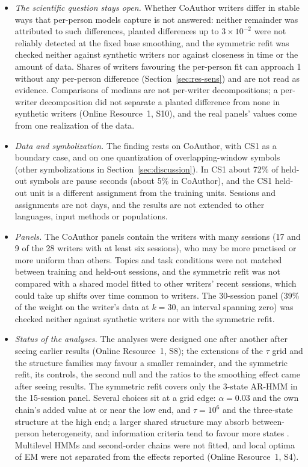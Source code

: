 \documentclass[pdflatex,sn-basic]{sn-jnl}
\newcommand{\Sref}[1]{Online Resource~1, S#1}
\newcommand{\arthree}{\mbox{3-state} \mbox{AR-HMM}}
\begin{document}
\begin{itemize}
\item \emph{The scientific question stays open.} Whether CoAuthor writers differ in stable ways that per-person models capture is not answered: neither remainder was attributed to such differences, planted differences up to $3\times10^{-2}$ were not reliably detected at the fixed base smoothing, and the symmetric refit was checked neither against synthetic writers nor against closeness in time or the amount of data. Shares of writers favouring the per-person fit can approach 1 without any per-person difference (Section~\ref{sec:res-sens}) and are not read as evidence. Comparisons of medians are not per-writer decompositions; a per-writer decomposition did not separate a planted difference from none in synthetic writers (\Sref{10}), and the real panels' values come from one realization of the data.
\item \emph{Data and symbolization.} The finding rests on CoAuthor, with CS1 as a boundary case, and on one quantization of overlapping-window symbols (other symbolizations in Section~\ref{sec:discussion}). In CS1 about 72\% of held-out symbols are pause seconds (about 5\% in CoAuthor), and the CS1 held-out unit is a different assignment from the training units. Sessions and assignments are not days, and the results are not extended to other languages, input methods or populations.
\item \emph{Panels.} The CoAuthor panels contain the writers with many sessions (17 and 9 of the 28 writers with at least six sessions), who may be more practised or more uniform than others. Topics and task conditions were not matched between training and held-out sessions, and the symmetric refit was not compared with a shared model fitted to other writers' recent sessions, which could take up shifts over time common to writers. The 30-session panel (39\% of the weight on the writer's data at $k=30$, an interval spanning zero) was checked neither against synthetic writers nor with the symmetric refit.
\item \emph{Status of the analyses.} The analyses were designed one after another after seeing earlier results (\Sref{8}); the extensions of the $\tau$ grid and the structure families may favour a smaller remainder, and the symmetric refit, its controls, the second null and the ratios to the smoothing effect came after seeing results. The symmetric refit covers only the \arthree{} in the 15-session panel. Several choices sit at a grid edge: $\alpha=0.03$ and the own chain's added value at or near the low end, and $\tau=10^6$ and the three-state structure at the high end; a larger shared structure may absorb between-person heterogeneity, and information criteria tend to favour more states \citep{Pohle2017}. Multilevel HMMs and second-order chains were not fitted, and local optima of EM were not separated from the effects reported (\Sref{4}).

\end{itemize}
\end{document}
